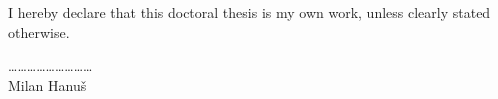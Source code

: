 \begin{declaration}

I hereby declare that this doctoral thesis is my own work, unless clearly stated otherwise.
\vspace{1cm}

\begin{flushright}
 \ldots\ldots\ldots\ldots\ldots\ldots\ldots\ldots\ldots\\
 Milan Hanu{\v s}~~~~~~~~~~
\end{flushright}
	
\end{declaration}